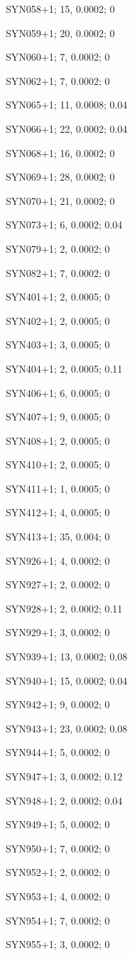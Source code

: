 SYN058+1; 15, 0.0002; 0

SYN059+1; 20, 0.0002; 0

SYN060+1; 7, 0.0002; 0

SYN062+1; 7, 0.0002; 0

SYN065+1; 11, 0.0008; 0.04

SYN066+1; 22, 0.0002; 0.04

SYN068+1; 16, 0.0002; 0

SYN069+1; 28, 0.0002; 0

SYN070+1; 21, 0.0002; 0

SYN073+1; 6, 0.0002; 0.04

SYN079+1; 2, 0.0002; 0

SYN082+1; 7, 0.0002; 0

SYN401+1; 2, 0.0005; 0

SYN402+1; 2, 0.0005; 0

SYN403+1; 3, 0.0005; 0

SYN404+1; 2, 0.0005; 0.11

SYN406+1; 6, 0.0005; 0

SYN407+1; 9, 0.0005; 0

SYN408+1; 2, 0.0005; 0

SYN410+1; 2, 0.0005; 0

SYN411+1; 1, 0.0005; 0

SYN412+1; 4, 0.0005; 0

SYN413+1; 35, 0.004; 0

SYN926+1; 4, 0.0002; 0

SYN927+1; 2, 0.0002; 0

SYN928+1; 2, 0.0002; 0.11 

SYN929+1; 3, 0.0002; 0

SYN939+1; 13, 0.0002; 0.08

SYN940+1; 15, 0.0002; 0.04

SYN942+1; 9, 0.0002; 0

SYN943+1; 23, 0.0002; 0.08

SYN944+1; 5, 0.0002; 0

SYN947+1; 3, 0.0002; 0.12

SYN948+1; 2, 0.0002; 0.04

SYN949+1; 5, 0.0002; 0

SYN950+1; 7, 0.0002; 0

SYN952+1; 2, 0.0002; 0

SYN953+1; 4, 0.0002; 0

SYN954+1; 7, 0.0002; 0

SYN955+1; 3, 0.0002; 0

